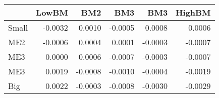 \begin{tabular}{lrrrrr}
\toprule
{} &   LowBM &     BM2 &     BM3 &     BM3 &  HighBM \\
\midrule
Small & -0.0032 &  0.0010 & -0.0005 &  0.0008 &  0.0006 \\
ME2   & -0.0006 &  0.0004 &  0.0001 & -0.0003 & -0.0007 \\
ME3   &  0.0000 &  0.0006 & -0.0007 & -0.0003 & -0.0007 \\
ME3   &  0.0019 & -0.0008 & -0.0010 & -0.0004 & -0.0019 \\
Big   &  0.0022 & -0.0003 & -0.0008 & -0.0030 & -0.0029 \\
\bottomrule
\end{tabular}

